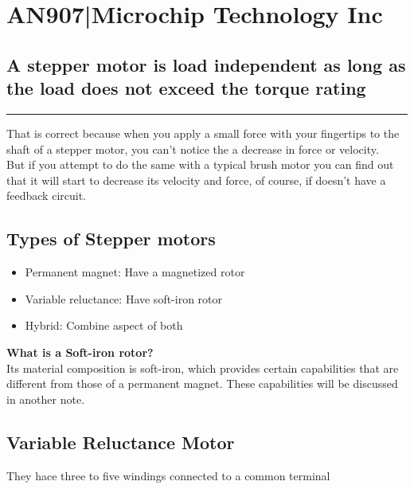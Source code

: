 \documentclass{report}
\newenvironment{doubt}{
  \begin{tcolorbox}[colback=blue!10, colframe=blue!40!black, title=Doubt]
}{
  \end{tcolorbox}
}
\begin{document}
\section{AN907|Microchip Technology Inc}

\subsection*{A stepper motor is load independent as long as the load does not exceed the torque rating}
\hrule
\vspace{4pt}
That is correct because when you apply a small force with your fingertips to the shaft of
a stepper motor, you can't notice the a decrease in force or velocity.\\
But if you attempt to do the same with a typical brush motor you can find out that it will
start to decrease its velocity and force, of course, if doesn't have a feedback circuit.

 
\subsection*{Types of Stepper motors}
\begin{itemize}
	\item Permanent magnet: Have a magnetized rotor
	\item Variable reluctance: Have soft-iron rotor
	\item Hybrid: Combine aspect of both
\end{itemize}

\begin{doubt}
	\textbf{What is a Soft-iron rotor?}\\
	Its material composition is soft-iron, which provides certain capabilities that are different
	from those of a permanent magnet. These capabilities will be discussed in another note.
\end{doubt}

\subsection*{Variable Reluctance Motor}
They hace three to five windings connected to a common terminal
\end{document}

